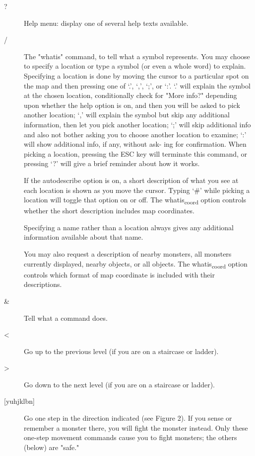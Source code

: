 \documentclass[11pt]{article}
\begin{document}
\begin{description}
\item[{?}] Help menu:  display one of several help texts available.

\item[{/}] The "whatis" command, to tell what a symbol represents.  You
may choose to specify a location or type a symbol (or even a whole
word)  to  explain.  Specifying a location is done by moving the
cursor to a particular spot on the map  and  then pressing one of
`.', `,', `;', or `:'.  `.' will explain the symbol at the chosen
location, conditionally check for "More info?"  depending  upon
whether  the help option is on, and then you will be asked to pick
another  location;  `,'  will explain the symbol but skip any
additional information, then let you pick another location; `;'
will skip additional info and also not bother asking you to choose
another location to examine; `:' will show additional info, if any,
without ask- ing for confirmation.  When picking a location,
pressing the ESC key will terminate this command, or  pressing  `?'
will give a brief reminder about how it works. 

If  the  autodescribe  option  is on, a short description of what
you see at each location is shown as you move the  cursor.   Typing
`\#' while picking a location will toggle that option on or off.
The whatis\textsubscript{coord} option controls  whether the short description
includes map coordinates. 

Specifying  a  name  rather than a location always gives any
additional information available about that name. 

You may also request a description of nearby  monsters,  all
monsters  currently  displayed,  nearby  objects, or all objects.
The whatis\textsubscript{coord} option controls which format of map coordinate is
included with their descriptions.
\end{description}
\begin{description}
\item[{\&}] Tell what a command does.

\item[{<}] Go  up  to  the previous level (if you are on a staircase or ladder).

\item[{>}] Go down to the next level (if you are on a staircase or ladder).

\item[{[yuhjklbn]}] Go  one  step in the direction indicated (see Figure
2).  If you sense or remember a monster there, you  will  fight  the
monster  instead.   Only  these  one-step  movement commands cause
you to fight monsters; the others (below) are "safe."
\end{description}
\end{document}
